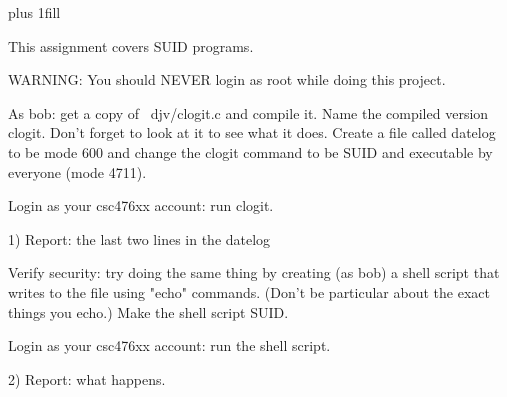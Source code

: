 
\rightskip=0pt plus 1fill

\parindent 0pt

This assignment covers SUID programs.

WARNING: You should NEVER login as root while doing this project.

As bob: get a copy of {\ltt{}~djv/clogit.c} and compile it.
Name the compiled version {\ltt{}clogit}.
Don't forget to look at it to see what it does.
Create a file called {\ltt{}datelog} to be mode 600 and
change the {\ltt{}clogit} command to be SUID and executable
by everyone (mode 4711).

Login as your csc476xx account: run clogit.

1) Report: the last two lines in the datelog

Verify security: try doing the same thing by creating (as bob) a shell
script that writes to the file using "echo" commands.
(Don't be particular about the exact things you echo.)
Make the shell script SUID.

Login as your csc476xx account: run the shell script.

2) Report: what happens.
\bye
